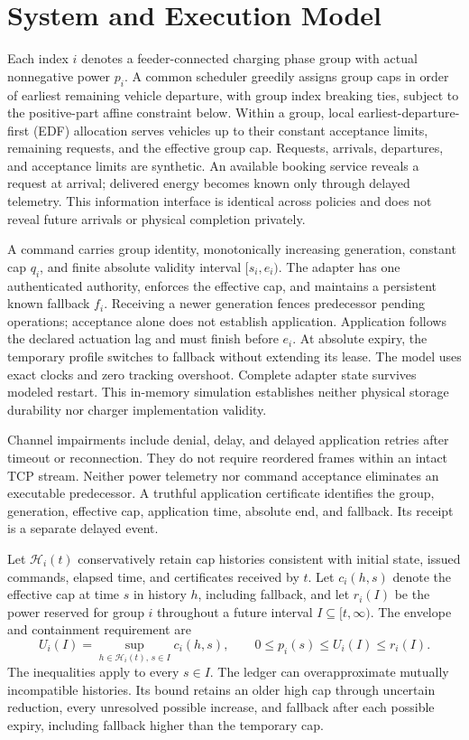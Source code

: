\section{System and Execution Model}
\label{sec:model}
Each index $i$ denotes a feeder-connected charging phase group with actual
nonnegative power $p_i$. A common scheduler greedily assigns group caps in order
of earliest remaining vehicle departure, with group index breaking ties, subject
to the positive-part affine constraint below. Within a group, local
earliest-departure-first (EDF) allocation serves vehicles up to their constant acceptance
limits, remaining requests, and the effective group cap. Requests, arrivals,
departures, and acceptance limits are synthetic. An available booking service
reveals a request at arrival; delivered energy becomes known only through delayed
telemetry. This information interface is identical across policies and does not
reveal future arrivals or physical completion privately.

A command carries group identity, monotonically increasing generation, constant
cap $q_i$, and finite absolute validity interval $[s_i,e_i)$. The adapter has one
authenticated authority, enforces the effective cap, and maintains a persistent
known fallback $f_i$. Receiving a newer generation fences predecessor pending
operations; acceptance alone does not establish application. Application follows
the declared actuation lag and must finish before $e_i$. At absolute expiry, the
temporary profile switches to fallback without extending its lease. The model
uses exact clocks and zero tracking overshoot. Complete adapter state survives
modeled restart. This in-memory simulation establishes neither physical storage
durability nor charger implementation validity.

Channel impairments include denial, delay, and delayed application retries after
timeout or reconnection. They do not require reordered frames within an intact
TCP stream. Neither power telemetry nor command acceptance eliminates an
executable predecessor. A truthful application certificate identifies the group,
generation, effective cap, application time, absolute end, and fallback. Its
receipt is a separate delayed event.

Let $\mathcal H_i(t)$ conservatively retain cap histories consistent with initial
state, issued commands, elapsed time, and certificates received by $t$.
Let $c_i(h,s)$ denote the effective cap at time $s$ in history $h$, including
fallback, and let $r_i(I)$ be the power reserved for group $i$ throughout a future
interval $I\subseteq[t,\infty)$. The envelope and containment requirement are
\begin{equation}
 U_i(I)=\sup_{h\in\mathcal H_i(t),\,s\in I}c_i(h,s),
 \qquad 0\le p_i(s)\le U_i(I)\le r_i(I).
 \label{eq:envelope}
\end{equation}
The inequalities apply to every $s\in I$. The ledger can overapproximate
mutually incompatible histories. Its bound retains
an older high cap through uncertain reduction, every unresolved possible
increase, and fallback after each possible expiry, including fallback higher
than the temporary cap.

